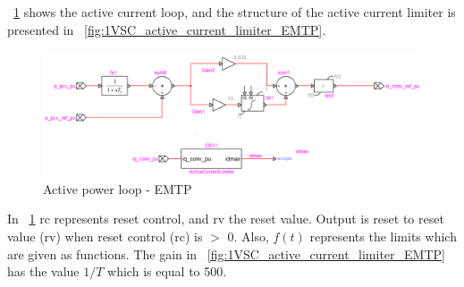 \documentclass{report}
\begin{document}
\figurename~\ref{fig:1VSC_active_power_EMTP} shows the active current loop, and the structure of the active current limiter is presented in \figurename~\ref{fig:1VSC_active_current_limiter_EMTP}.
\begin{figure}[H]
    \centering
    \includegraphics[scale = 0.55]{Figure_1VSC/1VSC_active_power_EMTP.png}
    \caption{Active power loop - EMTP}
    \label{fig:1VSC_active_power_EMTP}
\end{figure}
In \figurename~\ref{fig:1VSC_active_power_EMTP} rc represents reset control, and rv the reset value. Output is reset to reset value (rv) when reset control (rc) is $>$ 0. Also, $f(t)$ represents the limits which are given as functions. The gain in \figurename~\ref{fig:1VSC_active_current_limiter_EMTP} has the value $1/T$ which is equal to 500.
\end{document}
